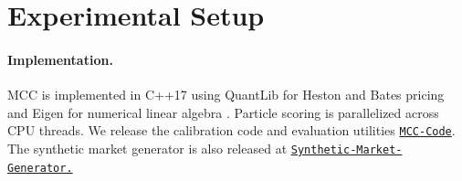 \documentclass[sigconf,anonymous,review]{acmart}
\begin{document}



\section{Experimental Setup}

\paragraph{Implementation.}
MCC is implemented in C++17 using QuantLib for Heston and Bates pricing \cite{quantlib} and Eigen for numerical linear algebra \cite{eigen}. Particle scoring is parallelized across CPU threads. We release the calibration code and evaluation utilities
\href{https://anonymous.4open.science/r/Measure_Coupled_Calibration/}
{\texttt{MCC-Code}}. The synthetic market generator is also released at \newline \href{https://anonymous.4open.science/r/Synthetic-Market-Generator/}{\texttt{Synthetic-Market-Generator.}}
\end{document}
